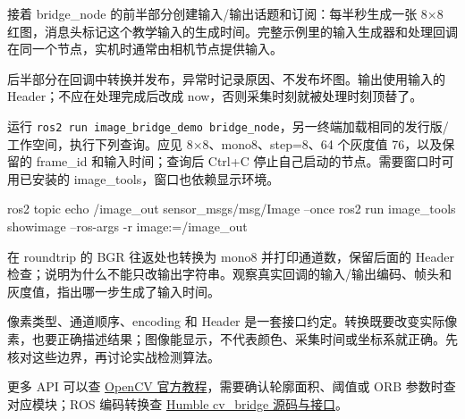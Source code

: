 \begin{example}
接着 bridge\_node 的前半部分创建输入/输出话题和订阅：每半秒生成一张 8×8 红图，消息头标记这个教学输入的生成时间。完整示例里的输入生成器和处理回调在同一个节点，实机时通常由相机节点提供输入。
\begin{cvblock}

\end{cvblock}
后半部分在回调中转换并发布，异常时记录原因、不发布坏图。输出使用输入的 Header；不应在处理完成后改成 now，否则采集时刻就被处理时刻顶替了。
\begin{cvblock}

\end{cvblock}
运行 \texttt{ros2 run image\_bridge\_demo bridge\_node}，另一终端加载相同的发行版/工作空间，执行下列查询。应见 8×8、mono8、step=8、64 个灰度值 76，以及保留的 frame\_id 和输入时间；查询后 Ctrl+C 停止自己启动的节点。需要窗口时可用已安装的 image\_tools，窗口也依赖显示环境。
\begin{cvblock}
\begin{tbash}
ros2 topic echo /image_out sensor_msgs/msg/Image --once
ros2 run image_tools showimage --ros-args -r image:=/image_out
\end{tbash}
\end{cvblock}
\end{example}
\begin{exercise}\label{ex:v2-cv-bridge}
在 roundtrip 的 BGR 往返处也转换为 mono8 并打印通道数，保留后面的 Header 检查；说明为什么不能只改输出字符串。观察真实回调的输入/输出编码、帧头和灰度值，指出哪一步生成了输入时间。
\end{exercise}
\begin{conclusion}
像素类型、通道顺序、encoding 和 Header 是一套接口约定。转换既要改变实际像素，也要正确描述结果；图像能显示，不代表颜色、采集时间或坐标系就正确。先核对这些边界，再讨论实战检测算法。
\end{conclusion}

更多 API 可以查 \href{https://docs.opencv.org/4.x/d9/df8/tutorial_root.html}{OpenCV 官方教程}，需要确认轮廓面积、阈值或 ORB 参数时查对应模块；ROS 编码转换查 \href{https://github.com/ros-perception/vision_opencv/tree/humble/cv_bridge}{Humble cv\_bridge 源码与接口}。
